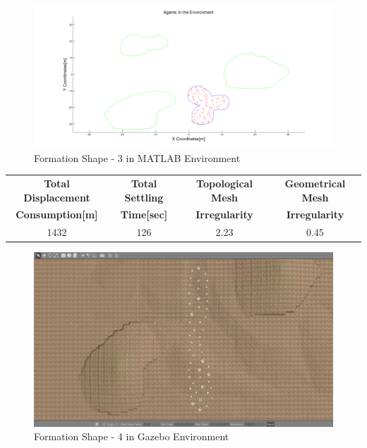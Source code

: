 \begin{figure}[H]
\caption{Formation Shape - 3 in MATLAB Environment}
\centerline{\includegraphics[scale = 0.32]{3}}
\end{figure} 
				 
\begin{center}
 \label{perf_shape3} 
\begin{tabular}{||c| c |c |c ||}
\hline
\textbf{Total Displacement }  & \textbf{Total Settling} & \textbf{Topological Mesh} & \textbf{Geometrical Mesh} \\ \textbf{Consumption[m]} & \textbf{Time[sec]}& \textbf{Irregularity} & \textbf{Irregularity} \\
\hline
1432 & 126 &  2.23& 0.45\\
\hline
\end{tabular}
\end{center}
				 
\begin{figure}[H]
\caption{Formation Shape - 4 in Gazebo Environment}
\centerline{\includegraphics[scale = 0.32]{4_Gazebo}}
\end{figure} 
			
